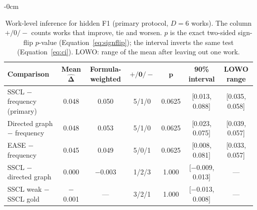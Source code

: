 \documentclass[10pt,a4paper]{article}
\newlength{\extralength}\setlength{\extralength}{3.7cm}
\begin{document}
\begin{table}[H]
\caption{Work-level inference for hidden F1 (primary protocol, $D=6$ works). The column $+/0/-$ counts works that improve, tie and worsen. $p$ is the exact two-sided sign-flip $p$-value (Equation~\eqref{eq:signflip}); the interval inverts the same test (Equation~\eqref{eq:ci}). LOWO: range of the mean after leaving out one work.}
\label{tab:inference}
\small
\begin{adjustwidth}{-\extralength}{0cm}
\begin{tabularx}{\linewidth}{Lcccccc}
\toprule
\textbf{Comparison} & \textbf{Mean $\bm{\widehat\Delta}$} & \textbf{Formula-weighted} & $\bm{+/0/-}$ & $\bm p$ & \textbf{90\% interval} & \textbf{LOWO range} \\
\midrule
SSCL $-$ frequency (primary) & 0.048 & 0.050 & 5/1/0 & 0.0625 & [0.013, 0.088] & [0.035, 0.058] \\
Directed graph $-$ frequency & 0.048 & 0.053 & 5/1/0 & 0.0625 & [0.023, 0.075] & [0.039, 0.057] \\
EASE $-$ frequency & 0.045 & 0.049 & 5/0/1 & 0.0625 & [0.008, 0.081] & [0.033, 0.057] \\
SSCL $-$ directed graph & 0.000 & $-$0.003 & 1/2/3 & 1.000 & [$-$0.009, 0.013] & --- \\
SSCL weak $-$ SSCL gold & $-$0.001 & --- & 3/2/1 & 1.000 & [$-$0.013, 0.008] & --- \\
\bottomrule
\end{tabularx}
\end{adjustwidth}
\end{table}
\end{document}
